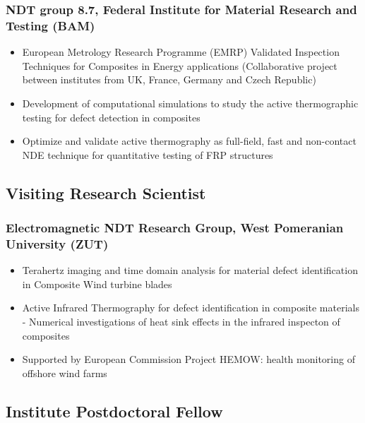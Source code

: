 \documentclass{my_cv}%
\begin{document}
\subsubsection{NDT group 8.7, Federal Institute for Material Research and Testing (BAM)}
\begin{itemize}[leftmargin=0.15in]
\setlength\itemsep{-0.1em}
\color{mygray}
\item European Metrology Research Programme (EMRP) Validated Inspection Techniques for Composites in Energy applications (Collaborative project between institutes from UK, France, Germany and Czech Republic)
\item Development of computational simulations to study the active thermographic testing for defect detection in composites
\item Optimize and validate active thermography as full-field, fast and non-contact NDE technique for quantitative testing of FRP structures
\end{itemize}

\subsection{Visiting Research Scientist}
\subsubsection{Electromagnetic NDT Research Group, West Pomeranian University (ZUT)}
\begin{itemize}[leftmargin=0.15in]
\setlength\itemsep{-0.1em}
\color{mygray}
\item Terahertz imaging and time domain analysis for material defect identification in Composite Wind turbine blades
\item Active Infrared Thermography for defect identification in composite materials - Numerical investigations of heat sink effects in the infrared inspecton of composites
\item Supported by European Commission Project HEMOW: health monitoring of offshore wind farms
\end{itemize}

\subsection{Institute Postdoctoral Fellow}
\end{document}
